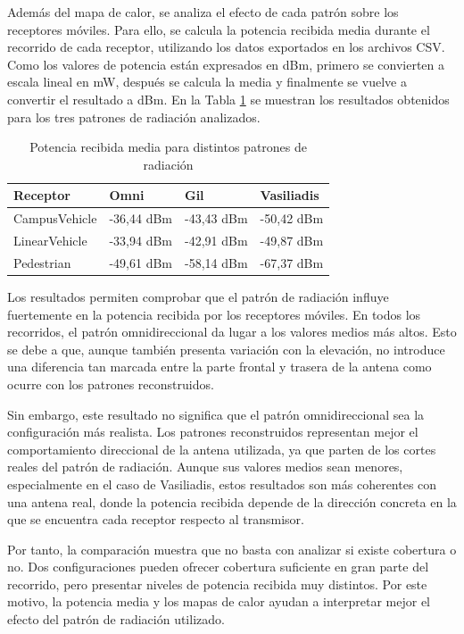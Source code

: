 Además del mapa de calor, se analiza el efecto de cada patrón sobre los receptores móviles. Para ello, se calcula la potencia recibida media durante el recorrido de cada receptor, utilizando los datos exportados en los archivos CSV. Como los valores de potencia están expresados en dBm, primero se convierten a escala lineal en mW, después se calcula la media y finalmente se vuelve a convertir el resultado a dBm. En la Tabla \ref{tab:comparativa_patrones_prx} se muestran los resultados obtenidos para los tres patrones de radiación analizados.

\begin{table}[H]
    \centering
    \begin{tabularx}{\textwidth}{@{}lXXX@{}}
        \toprule
        \textbf{Receptor} & \textbf{Omni} & \textbf{Gil} & \textbf{Vasiliadis} \\
        \midrule
        CampusVehicle & -36,44 dBm & -43,43 dBm & -50,42 dBm \\
        LinearVehicle & -33,94 dBm & -42,91 dBm & -49,87 dBm \\
        Pedestrian & -49,61 dBm & -58,14 dBm & -67,37 dBm \\
        \bottomrule
    \end{tabularx}
    \caption{Potencia recibida media para distintos patrones de radiación}
    \label{tab:comparativa_patrones_prx}
\end{table}

Los resultados permiten comprobar que el patrón de radiación influye fuertemente en la potencia recibida por los receptores móviles. En todos los recorridos, el patrón omnidireccional da lugar a los valores medios más altos. Esto se debe a que, aunque también presenta variación con la elevación, no introduce una diferencia tan marcada entre la parte frontal y trasera de la antena como ocurre con los patrones reconstruidos.

Sin embargo, este resultado no significa que el patrón omnidireccional sea la configuración más realista. Los patrones reconstruidos representan mejor el comportamiento direccional de la antena utilizada, ya que parten de los cortes reales del patrón de radiación. Aunque sus valores medios sean menores, especialmente en el caso de Vasiliadis, estos resultados son más coherentes con una antena real, donde la potencia recibida depende de la dirección concreta en la que se encuentra cada receptor respecto al transmisor.

Por tanto, la comparación muestra que no basta con analizar si existe cobertura o no. Dos configuraciones pueden ofrecer cobertura suficiente en gran parte del recorrido, pero presentar niveles de potencia recibida muy distintos. Por este motivo, la potencia media y los mapas de calor ayudan a interpretar mejor el efecto del patrón de radiación utilizado.

